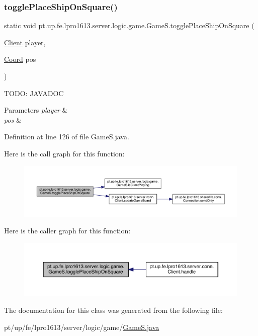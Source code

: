 \subsubsection{\texorpdfstring{toggle\+Place\+Ship\+On\+Square()}{togglePlaceShipOnSquare()}}
{\footnotesize\ttfamily static void pt.\+up.\+fe.\+lpro1613.\+server.\+logic.\+game.\+Game\+S.\+toggle\+Place\+Ship\+On\+Square (\begin{DoxyParamCaption}\item[{\hyperlink{classpt_1_1up_1_1fe_1_1lpro1613_1_1server_1_1conn_1_1_client}{Client}}]{player,  }\item[{\hyperlink{classpt_1_1up_1_1fe_1_1lpro1613_1_1sharedlib_1_1utils_1_1_coord}{Coord}}]{pos }\end{DoxyParamCaption})\hspace{0.3cm}{\ttfamily [static]}}

T\+O\+DO\+: J\+A\+V\+A\+D\+OC 
\begin{DoxyParams}{Parameters}
{\em player} & \\
\hline
{\em pos} & \\
\hline
\end{DoxyParams}


Definition at line 126 of file Game\+S.\+java.

Here is the call graph for this function\+:
\nopagebreak
\begin{figure}[H]
\begin{center}
\leavevmode
\includegraphics[width=350pt]{classpt_1_1up_1_1fe_1_1lpro1613_1_1server_1_1logic_1_1game_1_1_game_s_af95663046473b1a2aceebf4fd27906a2_cgraph}
\end{center}
\end{figure}
Here is the caller graph for this function\+:
\nopagebreak
\begin{figure}[H]
\begin{center}
\leavevmode
\includegraphics[width=350pt]{classpt_1_1up_1_1fe_1_1lpro1613_1_1server_1_1logic_1_1game_1_1_game_s_af95663046473b1a2aceebf4fd27906a2_icgraph}
\end{center}
\end{figure}


The documentation for this class was generated from the following file\+:\begin{DoxyCompactItemize}
\item 
pt/up/fe/lpro1613/server/logic/game/\hyperlink{_game_s_8java}{Game\+S.\+java}\end{DoxyCompactItemize}
